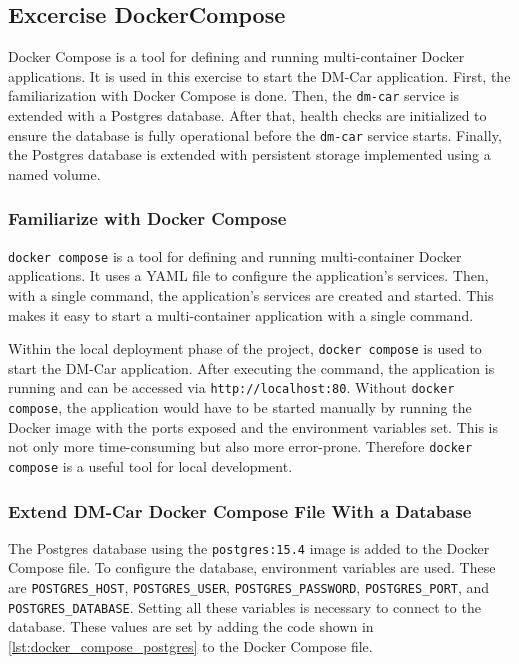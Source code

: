 \subsection{Excercise DockerCompose}
Docker Compose \cite{DOC-COM} is a tool for defining and running multi-container Docker applications.
It is used in this exercise to start the DM-Car application.
First, the familiarization with Docker Compose is done.
Then, the \texttt{dm-car} service is extended with a Postgres database.
After that, health checks are initialized to ensure the database is fully operational before the \texttt{dm-car} service starts.
Finally, the Postgres database is extended with persistent storage implemented using a named volume.

\subsubsection*{Familiarize with Docker Compose}
\texttt{docker compose} is a tool for defining and running multi-container Docker applications.
It uses a YAML file to configure the application's services.
Then, with a single command, the application's services are created and started.
This makes it easy to start a multi-container application with a single command.

Within the local deployment phase of the project, \texttt{docker compose} is used to start the DM-Car application.
After executing the command, the application is running and can be accessed via \texttt{http://localhost:80}.
Without \texttt{docker compose}, the application would have to be started manually by running the Docker image with the ports exposed and the environment variables set.
This is not only more time-consuming but also more error-prone.
Therefore \texttt{docker compose} is a useful tool for local development.

\subsubsection*{Extend DM-Car Docker Compose File With a Database}
The Postgres database using the \texttt{postgres:15.4} image is added to the Docker Compose file.
To configure the database, environment variables are used.
These are \texttt{POSTGRES\_HOST}, \texttt{POSTGRES\_USER}, \texttt{POSTGRES\_PASSWORD}, \texttt{POSTGRES\_PORT}, and \texttt{POSTGRES\_DATABASE}.
Setting all these variables is necessary to connect to the database.
These values are set by adding the code shown in \autoref*{lst:docker_compose_postgres} to the Docker Compose file.

